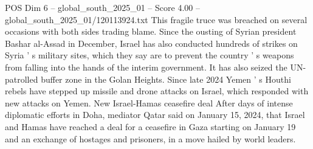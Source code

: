 \begin{textsample}{POS Dim 6 – global\_south\_2025\_01 – Score 4.00 – global\_south\_2025\_01/120113924.txt}
This fragile truce was breached on several occasions with both sides trading blame.
Since the ousting of Syrian president Bashar al-Assad in December, Israel has also conducted hundreds of strikes on Syria ' s military sites, which they say are to prevent the country ' s weapons from falling into the hands of the interim government.
It has also seized the UN-patrolled buffer zone in the Golan Heights.
Since late 2024 Yemen ' s Houthi rebels have stepped up missile and drone attacks on Israel, which responded with new attacks on Yemen.
New Israel-Hamas ceasefire deal After days of intense diplomatic efforts in Doha, mediator Qatar said on January 15, 2024, that Israel and Hamas have reached a deal for a ceasefire in Gaza starting on January 19 and an exchange of hostages and prisoners, in a move hailed by world leaders.

\end{textsample}
